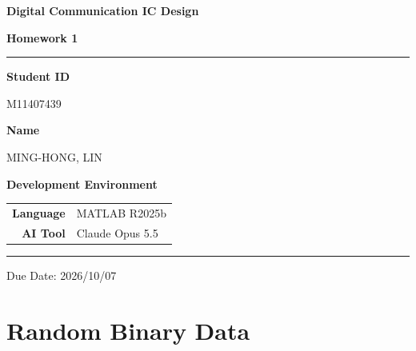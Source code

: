 \documentclass[12pt,a4paper]{report}
\begin{document}
\pagestyle{plain}

\begin{titlepage}
\centering
\vspace*{3cm}

{\fontsize{28}{34}\selectfont\bfseries Digital Communication IC Design\par}
\vspace{0.6em}
{\fontsize{20}{26}\selectfont\bfseries Homework 1\par}

\vspace{1.5cm}
\textcolor{crimson}{\rule{0.6\linewidth}{1.2pt}}
\vspace{1.5cm}

{\large\bfseries Student ID}\par
\vspace{0.4em}
{\large M11407439}\par

\vspace{0.8em}

{\large\bfseries Name}\par
\vspace{0.4em}
{\large MING-HONG, LIN}\par

\vspace{2cm}

{\large\bfseries Development Environment}\par
\vspace{0.8em}
\begin{tabular}{rl}
    \textbf{Language} & MATLAB R2025b \\[4pt]
    \textbf{AI Tool}  & Claude Opus 5.5 \\
\end{tabular}

\vfill

\textcolor{crimson}{\rule{0.6\linewidth}{0.6pt}}\par
\vspace{0.5em}
{\small Due Date: 2026/10/07}

\end{titlepage}

\tableofcontents
\newpage

\chapter{Random Binary Data}
\end{document}
